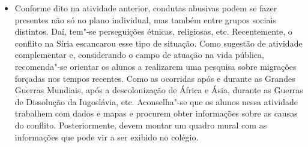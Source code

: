 \documentclass[12pt]{extarticle}
\begin{document}
\begin{itemize}
\item Conforme dito na atividade anterior, condutas abusivas podem se fazer
presentes não só no plano individual, mas também entre grupos sociais
distintos. Daí, tem"-se perseguições étnicas, religiosas, etc.
Recentemente, o conflito na Síria escancarou esse tipo de situação.
Como sugestão de atividade complementar e, considerando
o campo de atuação na vida pública, recomenda"-se orientar os alunos a realizarem uma pesquisa sobre
migrações forçadas nos tempos recentes. Como as ocorridas após e
durante as Grandes Guerras Mundiais, após a descolonização de África e
Ásia, durante as Guerras de Dissolução da Iugoslávia, etc.
Aconselha"-se que os alunos nessa atividade trabalhem com dados e mapas
e procurem obter informações sobre as causas do conflito.
Posteriormente, devem montar um quadro mural com as informações que
pode vir a ser exibido no colégio.

\begin{comment}
\subsection{Campo jornalístico"-midiático}

\begin{quote}
Em relação ao campo jornalístico"-midiático, espera"-se que os jovens
que chegam ao Ensino Médio sejam capazes de: compreender os fatos e
circunstâncias principais relatados; perceber a impossibilidade de
neutralidade absoluta no relato de fatos; adotar procedimentos básicos
de checagem de veracidade de informação; identificar diferentes pontos
de vista diante de questões polêmicas de relevância social; avaliar
argumentos utilizados e posicionar"-se em relação a eles de forma ética;
identificar e denunciar discursos de ódio e que envolvam desrespeito aos
Direitos Humanos; e produzir textos jornalísticos variados, tendo em
vista seus contextos de produção e características dos gêneros. Eles
também devem ter condições de analisar estratégias
linguístico"-discursivas utilizadas pelos textos publicitários e de
refletir sobre necessidades e condições de consumo.

No Ensino Médio, os jovens precisam aprofundar a análise dos interesses
que movem o campo jornalístico midiático, da relação entre informação e
opinião, com destaque para o fenômeno da pós"-verdade, consolidar o
desenvolvimento de habilidades, apropriar"-se de mais procedimentos
envolvidos na curadoria de informações, ampliar o contato com projetos
editoriais independentes e tomar consciência de que uma mídia
independente e plural é condição indispensável para a democracia.


\end{comment}
\end{itemize}
\end{document}
